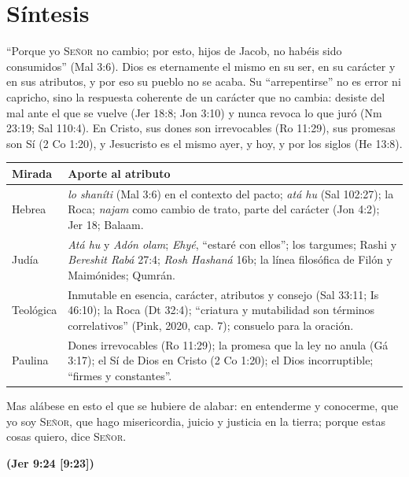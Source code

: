 \documentclass[11pt,letterpaper]{article}
\newcommand{\SENOR}{\textsc{Señor}}
\newcommand{\fuente}[1]{\par\hfill{\upshape\bfseries\small\textcolor{azul}{#1}}}
\begin{document}
\section{Síntesis}

``Porque yo \SENOR{} no cambio; por esto, hijos de Jacob, no habéis sido consumidos'' (Mal 3:6). Dios es eternamente el mismo en su ser, en su carácter y en sus atributos, y por eso su pueblo no se acaba. Su ``arrepentirse'' no es error ni capricho, sino la respuesta coherente de un carácter que no cambia: desiste del mal ante el que se vuelve (Jer 18:8; Jon 3:10) y nunca revoca lo que juró (Nm 23:19; Sal 110:4). En Cristo, sus dones son irrevocables (Ro 11:29), sus promesas son Sí (2 Co 1:20), y Jesucristo es el mismo ayer, y hoy, y por los siglos (He 13:8).

\begin{center}\small\renewcommand{\arraystretch}{1.18}
\begin{tabular}{@{}L{2.4cm}L{11.4cm}@{}}
\toprule
\textbf{Mirada} & \textbf{Aporte al atributo} \\ \midrule
Hebrea & \emph{lo shaníti} (Mal 3:6) en el contexto del pacto; \emph{atá hu} (Sal 102:27); la Roca; \emph{najam} como cambio de trato, parte del carácter (Jon 4:2); Jer 18; Balaam. \\
Judía & \emph{Atá hu} y \emph{Adón olam}; \emph{Ehyé}, ``estaré con ellos''; los targumes; Rashi y \emph{Bereshit Rabá} 27:4; \emph{Rosh Hashaná} 16b; la línea filosófica de Filón y Maimónides; Qumrán. \\
Teológica & Inmutable en esencia, carácter, atributos y consejo (Sal 33:11; Is 46:10); la Roca (Dt 32:4); ``criatura y mutabilidad son términos correlativos'' (Pink, 2020, cap. 7); consuelo para la oración. \\
Paulina & Dones irrevocables (Ro 11:29); la promesa que la ley no anula (Gá 3:17); el Sí de Dios en Cristo (2 Co 1:20); el Dios incorruptible; ``firmes y constantes''. \\
\bottomrule
\end{tabular}\end{center}

\begin{cita}Mas alábese en esto el que se hubiere de alabar: en entenderme y conocerme, que yo soy \SENOR, que hago misericordia, juicio y justicia en la tierra; porque estas cosas quiero, dice \SENOR.\fuente{(Jer 9:24 [9:23])}\end{cita}
\end{document}
